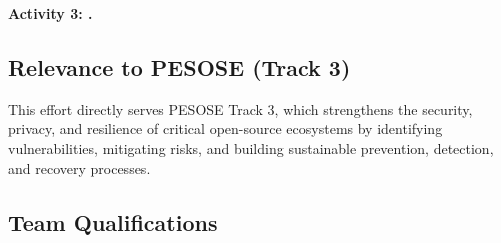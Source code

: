 \noindent\textbf{Activity 3: \actthree.}

\subsection{Relevance to PESOSE (Track 3)}

This effort directly serves PESOSE Track 3, which strengthens the security, privacy, and resilience of critical open-source ecosystems by identifying vulnerabilities, mitigating risks, and building sustainable prevention, detection, and recovery processes.

\subsection{Team Qualifications}

